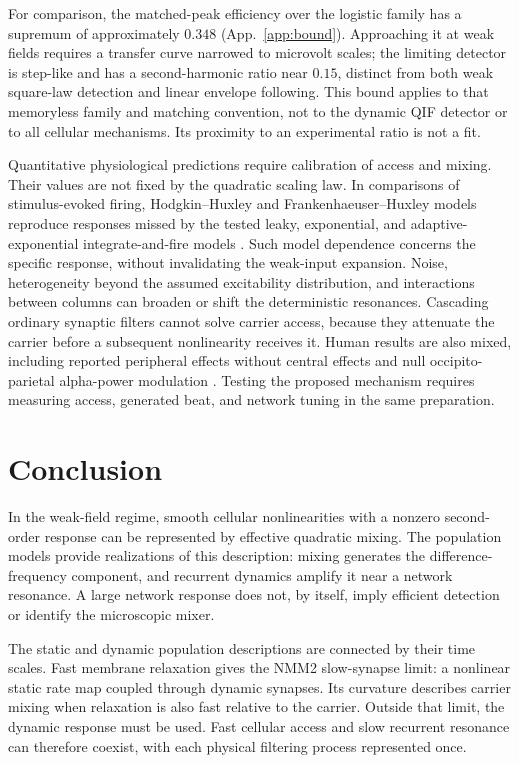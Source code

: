 \documentclass[11pt,a4paper]{article}
\begin{document}
For comparison, the matched-peak efficiency over the logistic family has a supremum
of approximately $0.348$ (App.~\ref{app:bound}). Approaching it at weak fields
requires a transfer curve narrowed to microvolt scales; the limiting detector is
step-like and has a second-harmonic ratio near $0.15$, distinct from both weak
square-law detection and linear envelope following. This bound applies to that
memoryless family and matching convention, not to the dynamic QIF detector or to
all cellular mechanisms. Its proximity to an experimental ratio is not a fit.

Quantitative physiological predictions require calibration of access and mixing.
Their values are not fixed by the quadratic scaling law. In comparisons of
stimulus-evoked firing, Hodgkin--Huxley and Frankenhaeuser--Huxley models reproduce
responses missed by the tested leaky, exponential, and adaptive-exponential
integrate-and-fire models \cite{plovie2025}. Such model dependence concerns the
specific response, without invalidating the weak-input expansion. Noise,
heterogeneity beyond the assumed excitability distribution, and interactions
between columns can broaden or shift the deterministic resonances. Cascading
ordinary synaptic filters cannot solve carrier access, because they attenuate
the carrier before a subsequent nonlinearity receives it. Human results are also
mixed, including reported peripheral effects without central effects
\cite{iszak2023} and null occipito-parietal alpha-power modulation
\cite{mansourinezhad2025}. Testing the proposed mechanism requires measuring
access, generated beat, and network tuning in the same preparation.

\section{Conclusion}
In the weak-field regime, smooth cellular nonlinearities with a nonzero
second-order response can be represented by effective quadratic mixing. The
population models provide realizations of this description: mixing generates
the difference-frequency component, and recurrent dynamics amplify it near a
network resonance. A large network response does not, by itself, imply efficient
detection or identify the microscopic mixer.

The static and dynamic population descriptions are connected by their time scales.
Fast membrane relaxation gives the NMM2 slow-synapse limit: a nonlinear static rate
map coupled through dynamic synapses. Its curvature describes carrier mixing when
relaxation is also fast relative to the carrier. Outside that limit, the dynamic
response must be used. Fast cellular access and slow recurrent resonance can
therefore coexist, with each physical filtering process represented once.
\end{document}
